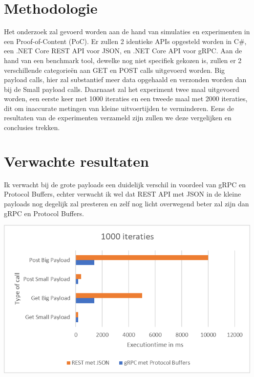 \section{Methodologie}
\label{sec:methodologie}
Het onderzoek zal gevoerd worden aan de hand van simulaties en experimenten in een Proof-of-Content (PoC). Er zullen 2 identieke APIs opgesteld worden in C\#, een .NET Core REST API voor JSON, en .NET Core API voor gRPC. Aan de hand van een benchmark tool, dewelke nog niet specifiek gekozen is, zullen er 2 verschillende categorieën aan GET en POST calls uitgevoerd worden. Big payload calls, hier zal substantief meer data opgehaald en verzonden worden dan bij de Small payload calls. Daarnaast zal het experiment twee maal uitgevoerd worden, een eerste keer met 1000 iteraties en een tweede maal met 2000 iteraties, dit om inaccurate metingen van kleine uitvoertijden te verminderen.
Eens de resultaten van de experimenten verzameld zijn zullen we deze vergelijken en conclusies trekken.
\section{Verwachte resultaten}
\label{sec:verwachte_resultaten}
Ik verwacht bij de grote payloads een duidelijk verschil in voordeel van gRPC en Protocol Buffers, echter verwacht ik wel dat REST API met JSON in de kleine payloads nog degelijk zal presteren en zelf nog licht overwegend beter zal zijn dan gRPC en Protocol Buffers.

	\centering
	\includegraphics[width=1\linewidth]{screenshot001}




